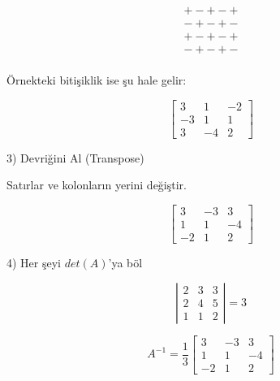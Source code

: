 \documentclass[12pt,fleqn]{article}\usepackage{../../common}
\begin{document}
$$ 
\begin{array}{rr}
+ - + - + \\
- + - + - \\
+ - + - + \\
- + - + - \\
\end{array}
 $$


Örnekteki bitişiklik ise şu hale gelir:

$$ 
\left[\begin{array}{rrr}
3 & 1 & -2 \\
-3 & 1 & 1 \\
3 & -4 & 2
\end{array}\right]
 $$

3) Devriğini Al (Transpose)

Satırlar ve kolonların yerini değiştir. 

$$ 
\left[\begin{array}{rrr}
3 & -3 & 3 \\
1 & 1 & -4 \\
-2 & 1 & 2
\end{array}\right]
 $$

4) Her şeyi $det(A)$'ya böl 

$$ 
\left|\begin{array}{rrr}
2 & 3 & 3 \\
2 & 4 & 5 \\
1 & 1 & 2
\end{array}\right| = 3
 $$

$$ A^{-1} = 
\frac{1}{3}
\left[\begin{array}{rrr}
3 & -3 & 3 \\
1 & 1 & -4 \\
-2 & 1 & 2
\end{array}\right]
 $$
\end{document}
